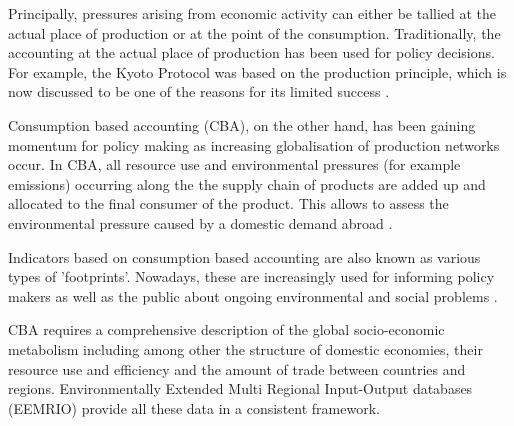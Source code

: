 Principally, pressures arising from economic activity can either be tallied at
the actual place of production or at the point of the consumption.
Traditionally, the accounting at the actual place of production has been used
for policy decisions. For example, the Kyoto Protocol was based on the
production principle, which is now discussed to be one of the reasons for its
limited success \cite{23192129}. 

Consumption based accounting (CBA), on the other hand, has been gaining
momentum for policy making \cite{Harris_2013} as increasing globalisation of production networks occur. In CBA, all resource use and environmental
pressures (for example emissions) occurring along the the supply chain of
products are added up and allocated to the final consumer of the product. This
allows to assess the environmental pressure caused by a domestic
demand abroad \cite{Weinzettel_2013, 20212122}.

Indicators based on consumption based accounting are also known as various
types of 'footprints'. Nowadays, these are increasingly used for informing policy makers as
well as the public about ongoing environmental \cite{tukker_global_2014, steen-olsen_carbon_2012, Kanemoto_2014, united_nations_university_inclusive_2012}
and social problems \cite{Simas_2014}. 

CBA requires a comprehensive description of the global socio-economic
metabolism including among other the structure of domestic economies, their
resource use and efficiency and the amount of trade between countries and regions.
Environmentally Extended Multi Regional Input-Output databases (EEMRIO) provide
all these data in a consistent framework. 